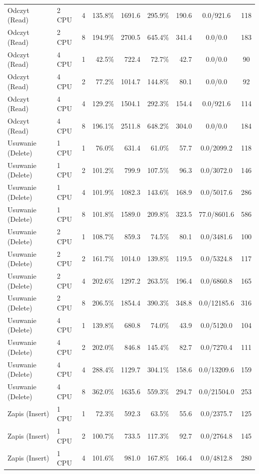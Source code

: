 \begin{table}[ht]
{\begin{tabular}{llcrrrrcc}
Odczyt (Read) & 2 CPU & 4 & 135.8\% & 1691.6 & 295.9\% & 190.6 & 0.0/921.6 & 118 \\
Odczyt (Read) & 2 CPU & 8 & 194.9\% & 2700.5 & 645.4\% & 341.4 & 0.0/0.0 & 183 \\
Odczyt (Read) & 4 CPU & 1 & 42.5\% & 722.4 & 72.7\% & 42.7 & 0.0/0.0 & 90 \\
Odczyt (Read) & 4 CPU & 2 & 77.2\% & 1014.7 & 144.8\% & 80.1 & 0.0/0.0 & 92 \\
Odczyt (Read) & 4 CPU & 4 & 129.2\% & 1504.1 & 292.3\% & 154.4 & 0.0/921.6 & 114 \\
Odczyt (Read) & 4 CPU & 8 & 196.1\% & 2511.8 & 648.2\% & 304.0 & 0.0/0.0 & 184 \\
Usuwanie (Delete) & 1 CPU & 1 & 76.0\% & 631.4 & 61.0\% & 57.7 & 0.0/2099.2 & 118 \\
Usuwanie (Delete) & 1 CPU & 2 & 101.2\% & 799.9 & 107.5\% & 96.3 & 0.0/3072.0 & 146 \\
Usuwanie (Delete) & 1 CPU & 4 & 101.9\% & 1082.3 & 143.6\% & 168.9 & 0.0/5017.6 & 286 \\
Usuwanie (Delete) & 1 CPU & 8 & 101.8\% & 1589.0 & 209.8\% & 323.5 & 77.0/8601.6 & 586 \\
Usuwanie (Delete) & 2 CPU & 1 & 108.7\% & 859.3 & 74.5\% & 80.1 & 0.0/3481.6 & 100 \\
Usuwanie (Delete) & 2 CPU & 2 & 161.7\% & 1014.0 & 139.8\% & 119.5 & 0.0/5324.8 & 117 \\
Usuwanie (Delete) & 2 CPU & 4 & 202.6\% & 1297.2 & 263.5\% & 196.4 & 0.0/6860.8 & 165 \\
Usuwanie (Delete) & 2 CPU & 8 & 206.5\% & 1854.4 & 390.3\% & 348.8 & 0.0/12185.6 & 316 \\
Usuwanie (Delete) & 4 CPU & 1 & 139.8\% & 680.8 & 74.0\% & 43.9 & 0.0/5120.0 & 104 \\
Usuwanie (Delete) & 4 CPU & 2 & 202.0\% & 846.8 & 145.4\% & 82.7 & 0.0/7270.4 & 111 \\
Usuwanie (Delete) & 4 CPU & 4 & 288.4\% & 1129.7 & 304.1\% & 158.6 & 0.0/13209.6 & 159 \\
Usuwanie (Delete) & 4 CPU & 8 & 362.0\% & 1635.6 & 559.3\% & 294.7 & 0.0/21504.0 & 253 \\
Zapis (Insert) & 1 CPU & 1 & 72.3\% & 592.3 & 63.5\% & 55.6 & 0.0/2375.7 & 125 \\
Zapis (Insert) & 1 CPU & 2 & 100.7\% & 733.5 & 117.3\% & 92.7 & 0.0/2764.8 & 145 \\
Zapis (Insert) & 1 CPU & 4 & 101.6\% & 981.0 & 167.8\% & 166.4 & 0.0/4812.8 & 280 \\

\end{tabular}}
\end{table}
